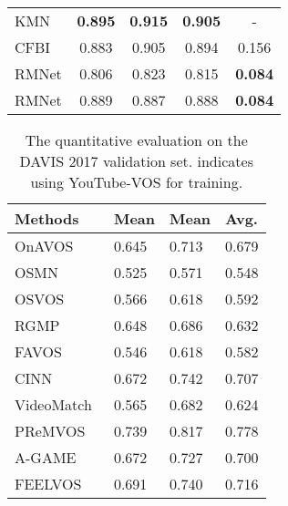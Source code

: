 \documentclass[final]{cvpr}
\begin{document}
\begin{table}
{\begin{tabularx}{1.08\linewidth}{lcccc}
KMN ~\cite{DBLP:conf/eccv/SeongHK20}
                      & \bf{0.895} & \bf{0.915} & \bf{0.905} & - \\
CFBI ~\cite{DBLP:conf/eccv/YangWY20}
                      & 0.883      & 0.905      & 0.894      & 0.156 \\
        \midrule
        RMNet         & 0.806      & 0.823      & 0.815      & \bf{0.084} \\
        RMNet  
                      & 0.889      & 0.887      & 0.888      & \bf{0.084} \\
        \bottomrule
    \end{tabularx}
  }
  \label{tab:davis2016}
  \vspace{-2 mm}
\end{table}

\begin{table}
  \caption{The quantitative evaluation on the DAVIS 2017 validation set.  indicates using YouTube-VOS for training.}
  \vspace{.5 mm}
  \begin{tabularx}{\linewidth}{lYYY}
    \toprule
    Methods       &  Mean &  Mean
                  & Avg. \\
    \midrule
    OnAVOS~\cite{DBLP:conf/bmvc/VoigtlaenderL17}
                  & 0.645      & 0.713      & 0.679 \\
    OSMN~\cite{DBLP:conf/cvpr/YangWXYK18}
                  & 0.525      & 0.571      & 0.548 \\
    OSVOS~\cite{DBLP:conf/cvpr/CaellesMPLCG17}
                  & 0.566      & 0.618      & 0.592 \\
    RGMP~\cite{DBLP:conf/cvpr/OhLSK18}
                  & 0.648      & 0.686      & 0.632 \\
    FAVOS~\cite{DBLP:conf/cvpr/ChengTHW018}
                  & 0.546      & 0.618      & 0.582 \\
    CINN~\cite{DBLP:conf/cvpr/BaoW018}
                  & 0.672      & 0.742      & 0.707 \\
    VideoMatch~\cite{DBLP:conf/eccv/HuHS18a}
                  & 0.565      & 0.682      & 0.624 \\
    PReMVOS~\cite{DBLP:conf/accv/LuitenVL18}
                  & 0.739      & 0.817      & 0.778 \\
    A-GAME ~\cite{DBLP:conf/cvpr/JohnanderDBKF19}
                  & 0.672      & 0.727      & 0.700 \\
    FEELVOS ~\cite{DBLP:conf/cvpr/VoigtlaenderCSA19}
                  & 0.691      & 0.740      & 0.716 \\

\end{tabularx}
\end{table}
\end{document}
